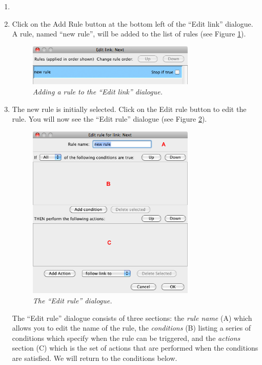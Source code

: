 \documentclass{article}
\begin{document}
\begin{enumerate}
\item \item Click on the Add Rule button at the bottom left of the ``Edit link''
dialogue. A rule, named ``new rule'', will be added to the list of rules (see
Figure \ref{fig:tut1:new_rule}).

\begin{figure}[ht]
  \centering
  \includegraphics[width=8cm]{images/hypedyn-tutorial-1-figure-8b}
  \caption{\textit{Adding a rule to the ``Edit link'' dialogue.}}
  \label{fig:tut1:new_rule}
\end{figure} 

\item The new rule is initially selected. Click on the Edit rule button to edit
the rule. You will now see the ``Edit rule'' dialogue (see Figure
\ref{fig:tut1:edit_rule}).

\begin{figure}[ht]
  \centering
  \includegraphics[width=8cm]{images/hypedyn-tutorial-1-figure-8c}
  \caption{\textit{The ``Edit rule'' dialogue.}}
  \label{fig:tut1:edit_rule}
\end{figure} 

The ``Edit rule'' dialogue consists of three sections: the \textit{rule name} (A)
which allows you to edit the name of the rule, the \textit{conditions} (B)
listing a series of conditions which specify when the rule can be triggered, and
the \textit{actions} section (C) which is the set of actions that are performed
when the conditions are satisfied. We will return to the conditions below.


\end{enumerate}
\end{document}
